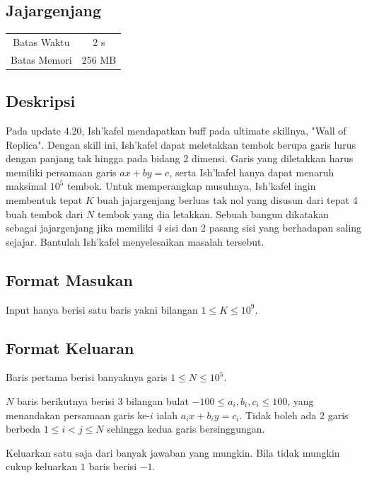 \documentclass{article}
\begin{document}
\begin{center}
    \section*{Jajargenjang} %

    \begin{tabular}{ | c c | }
        \hline
        Batas Waktu  & 2 s \\    %
        Batas Memori & 256 MB \\  %
        \hline
    \end{tabular}
\end{center}

\subsection*{Deskripsi}
Pada update 4.20, Ish’kafel mendapatkan buff pada ultimate skillnya, "Wall of Replica". Dengan skill ini, Ish’kafel dapat meletakkan tembok berupa garis lurus dengan panjang tak hingga pada bidang 2 dimensi. Garis yang diletakkan harus memiliki persamaan garis $a x + b y = c$, serta Ish’kafel hanya dapat menaruh maksimal $10^5$ tembok. Untuk memperangkap musuhnya, Ish’kafel ingin membentuk tepat $K$ buah jajargenjang berluas tak nol yang disusun dari tepat 4 buah tembok dari $N$ tembok yang dia letakkan. Sebuah bangun dikatakan sebagai jajargenjang jika memiliki 4 sisi dan 2 pasang sisi yang berhadapan saling sejajar. Bantulah Ish’kafel menyelesaikan masalah tersebut.

\subsection*{Format Masukan}
Input hanya berisi satu baris yakni bilangan $1 \leq K \leq 10^9$.

\subsection*{Format Keluaran}
Baris pertama berisi banyaknya garis $1 \leq N \leq 10^5$.

$N$ baris berikutnya berisi 3 bilangan bulat $-100 \leq a_i, b_i, c_i \leq 100$, yang menandakan persamaan garis ke-$i$ ialah $a_i x + b_i y = c_i$. Tidak boleh ada 2 garis berbeda $1 \leq i < j \leq N$ sehingga kedua garis bersinggungan.

Keluarkan satu saja dari banyak jawaban yang mungkin. Bila tidak mungkin cukup keluarkan $1$ baris berisi $-1$.
\end{document}
